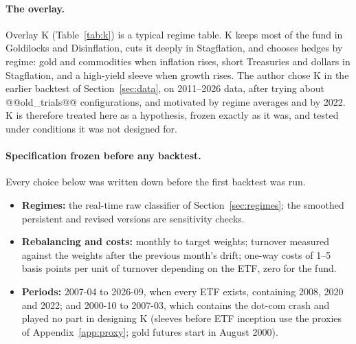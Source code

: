 \documentclass[11pt,a4paper]{article}
\begin{document}
\paragraph{The overlay.} Overlay K (Table~\ref{tab:k}) is a typical regime table. K keeps most of the fund in
Goldilocks and Disinflation, cuts it deeply in Stagflation, and chooses hedges by regime: gold and
commodities when inflation rises, short Treasuries and dollars in Stagflation, and a high-yield sleeve when growth rises. The author chose K in the earlier backtest of Section~\ref{sec:data}, on 2011--2026
data, after trying about @@old_trials@@ configurations, and motivated by regime averages and by 2022. K is therefore treated here as a hypothesis, frozen exactly as it was, and tested under conditions it was not
designed for.

\paragraph{Specification frozen before any backtest.} Every choice below was written down before the first
backtest was run.
\begin{itemize}
\item \textbf{Regimes:} the real-time raw classifier of Section~\ref{sec:regimes}; the smoothed persistent and
revised versions are sensitivity checks.
\item \textbf{Rebalancing and costs:} monthly to target weights; turnover measured against the weights after the
previous month's drift; one-way costs of 1--5 basis points per unit of turnover depending on the ETF, zero for
the fund.
\item \textbf{Periods:} 2007-04 to 2026-09, when every ETF exists, containing 2008, 2020 and 2022; and 2000-10 to
2007-03, which contains the dot-com crash and played no part in designing K (sleeves before ETF inception use
the proxies of Appendix~\ref{app:proxy}; gold futures start in August 2000).
\end{itemize}
\end{document}
